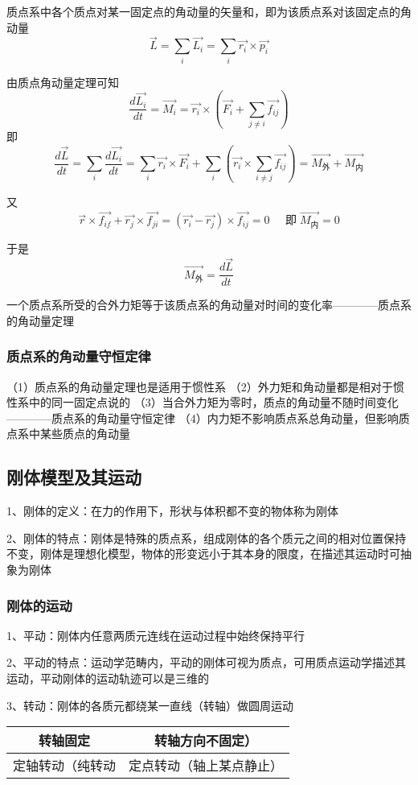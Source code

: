 \documentclass[UTF8]{article}
\begin{document}
    质点系中各个质点对某一固定点的角动量的矢量和，即为该质点系对该固定点的角动量\[\vec{L} = \sum_i\vec{L_i} = \sum_i\vec{r_i}\times\vec{p_i}\]

    由质点角动量定理可知\[\frac{d\vec{L_i}}{dt} = \vec{M_i} = \vec{r_i}\times(\vec{F_i}+\sum_{j\neq i}\vec{f_{ij}})\]即\[\frac{d\vec{L}}{dt} = \sum_i\frac{d\vec{L_i}}{dt} = \sum_i\vec{r_i}\times\vec{F_i} + \sum_i(\vec{r_i}\times\sum_{i\neq j}\vec{f_{ij}}) = \vec{M_{\mbox{外}}} + \vec{M_{\mbox{内}}}\]

    又\[\vec{r}\times\vec{f_{if}} + \vec{r_j}\times\vec{f_{ji}} = (\vec{r_i} - \vec{r_j})\times\vec{f_{ij}} = 0\;\;\;\;\;\mbox{即}\;\vec{M_{\mbox{内}}} = 0\]

    于是\[\vec{M_{\mbox{外}}} = \frac{d\vec{L}}{dt}\]

    一个质点系所受的合外力矩等于该质点系的角动量对时间的变化率————质点系的角动量定理

\subsubsection{质点系的角动量守恒定律}

    （1）质点系的角动量定理也是适用于惯性系
    （2）外力矩和角动量都是相对于惯性系中的同一固定点说的
    （3）当合外力矩为零时，质点的角动量不随时间变化————质点系的角动量守恒定律
    （4）内力矩不影响质点系总角动量，但影响质点系中某些质点的角动量

\subsection{刚体模型及其运动}

    1、刚体的定义：在力的作用下，形状与体积都不变的物体称为刚体

    2、刚体的特点：刚体是特殊的质点系，组成刚体的各个质元之间的相对位置保持不变，刚体是理想化模型，物体的形变远小于其本身的限度，在描述其运动时可抽象为刚体

\subsubsection{刚体的运动}

    1、平动：刚体内任意两质元连线在运动过程中始终保持平行

    2、平动的特点：运动学范畴内，平动的刚体可视为质点，可用质点运动学描述其运动，平动刚体的运动轨迹可以是三维的

    3、转动：刚体的各质元都绕某一直线（转轴）做圆周运动

    \begin{tabular}{|c|c|}%
        \hline  %
        转轴固定&转轴方向不固定）\\
        \hline  %
        定轴转动（纯转动&定点转动（轴上某点静止）\\
        \hline %
    \end{tabular}
\end{document}
